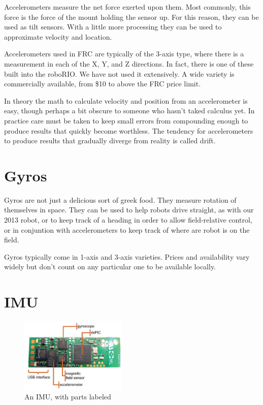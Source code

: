 \documentclass{article}
\begin{document}
Accelerometers measure the net force exerted upon them.  Most commonly, this force is the force of the mount holding the sensor up.  For this reason, they can be used as tilt sensors.  With a little more processing they can be used to approximate velocity and location.  

Accelerometers used in FRC are typically of the 3-axis type, where there is a measurement in each of the X, Y, and Z directions.  In fact, there is one of these built into the roboRIO.  We have not used it extensively.  A wide variety is commercially available, from \$10 to above the FRC price limit.  

In theory the math to calculate velocity and position from an accelerometer is easy, though perhaps a bit obscure to someone who hasn't taked calculus yet.  In practice care must be taken to keep small errors from compounding enough to produce results that quickly become worthless.  The tendency for accelerometers to produce results that gradually diverge from reality is called drift.  

\section{Gyros}
Gyros are not just a delicious sort of greek food.  They measure rotation of themselves in space.  They can be used to help robots drive straight, as with our 2013 robot, or to keep track of a heading in order to allow field-relative control, or in conjuntion with accelerometers to keep track of where are robot is on the field.  

Gyros typically come in 1-axis and 3-axis varieties.  Prices and availability vary widely but don't count on any particular one to be available locally.  

\section{IMU}
\begin{figure}[ht]
\centering
\includegraphics[width=2in]{imu.png}
\caption{An IMU, with parts labeled}
\end{figure}
\end{document}
